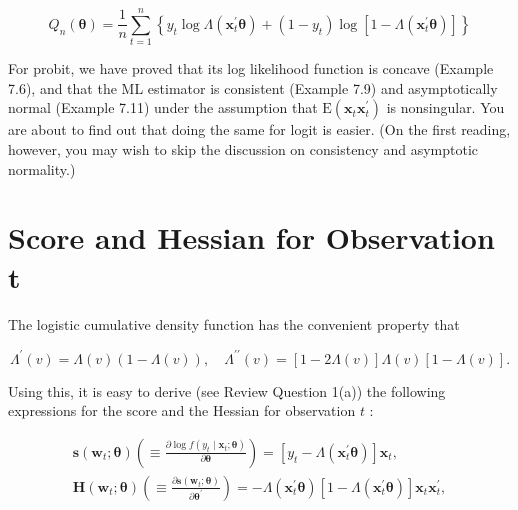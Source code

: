 \documentclass[10pt]{article}
\begin{document}
\begin{equation*}
Q_{n}(\boldsymbol{\theta})=\frac{1}{n} \sum_{t=1}^{n}\left\{y_{t} \log \Lambda\left(\mathbf{x}_{t}^{\prime} \boldsymbol{\theta}\right)+\left(1-y_{t}\right) \log \left[1-\Lambda\left(\mathbf{x}_{t}^{\prime} \boldsymbol{\theta}\right)\right]\right\} \tag{8.1.5}
\end{equation*}


For probit, we have proved that its log likelihood function is concave (Example 7.6), and that the ML estimator is consistent (Example 7.9) and asymptotically normal (Example 7.11) under the assumption that $\mathrm{E}\left(\mathbf{x}_{t} \mathbf{x}_{t}^{\prime}\right)$ is nonsingular. You are about to find out that doing the same for logit is easier. (On the first reading, however, you may wish to skip the discussion on consistency and asymptotic normality.)

\section*{Score and Hessian for Observation $\boldsymbol{t}$}
The logistic cumulative density function has the convenient property that


\begin{equation*}
\Lambda^{\prime}(v)=\Lambda(v)(1-\Lambda(v)), \quad \Lambda^{\prime \prime}(v)=[1-2 \Lambda(v)] \Lambda(v)[1-\Lambda(v)] . \tag{8.1.6}
\end{equation*}


Using this, it is easy to derive (see Review Question 1(a)) the following expressions for the score and the Hessian for observation $t$ :


\begin{gather*}
\mathbf{s}\left(\mathbf{w}_{t} ; \boldsymbol{\theta}\right)\left(\equiv \frac{\partial \log f\left(y_{t} \mid \mathbf{x}_{t} ; \boldsymbol{\theta}\right)}{\partial \boldsymbol{\theta}}\right)=\left[y_{t}-\Lambda\left(\mathbf{x}_{t}^{\prime} \boldsymbol{\theta}\right)\right] \mathbf{x}_{t},  \tag{8.1.7}\\
\mathbf{H}\left(\mathbf{w}_{t} ; \boldsymbol{\theta}\right)\left(\equiv \frac{\partial \mathbf{s}\left(\mathbf{w}_{t} ; \boldsymbol{\theta}\right)}{\partial \boldsymbol{\theta}^{\prime}}\right)=-\Lambda\left(\mathbf{x}_{t}^{\prime} \boldsymbol{\theta}\right)\left[1-\Lambda\left(\mathbf{x}_{t}^{\prime} \boldsymbol{\theta}\right)\right] \mathbf{x}_{t} \mathbf{x}_{t}^{\prime}, \tag{8.1.8}
\end{gather*}
\end{document}
